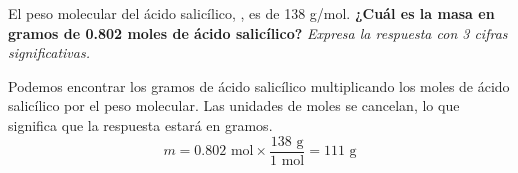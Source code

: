 El peso molecular del ácido salicílico, , es de 138 g/mol.
\textbf{¿Cuál es la masa en gramos de 0.802 moles de ácido salicílico?}
\emph{Expresa la respuesta con 3 cifras significativas.}

\begin{solutionbox}{4cm}
    Podemos encontrar los gramos de ácido salicílico multiplicando los moles de ácido salicílico por el peso molecular. Las unidades de moles se cancelan, lo que significa que la respuesta estará en gramos.
    \[ m =  0.802 \text{ mol} \times \frac{138 \text{ g}}{1 \text{ mol}} = 111 \text{ g} \]
\end{solutionbox}